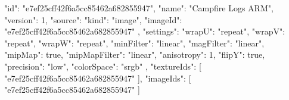 {
  "id": "e7ef25cff42f6a5cc85462a682855947",
  "name": "Campfire Logs ARM",
  "version": 1,
  "source": {
    "kind": "image",
    "imageId": "e7ef25cff42f6a5cc85462a682855947"
  },
  "settings": {
    "wrapU": "repeat",
    "wrapV": "repeat",
    "wrapW": "repeat",
    "minFilter": "linear",
    "magFilter": "linear",
    "mipMap": true,
    "mipMapFilter": "linear",
    "anisotropy": 1,
    "flipY": true,
    "precision": "low",
    "colorSpace": "srgb"
  },
  "textureIds": [
    "e7ef25cff42f6a5cc85462a682855947"
  ],
  "imageIds": [
    "e7ef25cff42f6a5cc85462a682855947"
  ]
}
